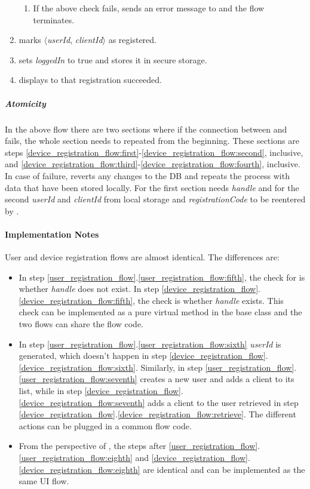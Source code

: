 \documentclass[a4paper,10pt,draft]{article}
\newcommand{\handle}{\emph{handle}}
\newcommand{\registrationCode}{\emph{registrationCode}}
\newcommand{\userId}{\emph{userId}}
\newcommand{\clientId}{\emph{clientId}}
\newcommand{\loggedIn}{\emph{loggedIn}}
\begin{document}
\begin{enumerate}
 \begin{enumerate}
  \item If the above check fails, \Server{} sends an error message to \Client{} and the flow terminates.
 \end{enumerate}
 \item\label{device_registration_flow:fourth} \Server{} marks $\langle$\userId{}, \clientId{}$\rangle$ as registered.
 \item \Client{} sets \loggedIn{} to true and stores it in secure storage.
 \item \Client{} displays to \User{} that registration succeeded.
\end{enumerate}

\subparagraph{Atomicity}
In the above flow there are two sections where if the connection between \Server{} and \Client{} fails, the whole section needs to repeated from the beginning. These sections are 
steps \ref{device_registration_flow:first}-\ref{device_registration_flow:second}, inclusive, and \ref{device_registration_flow:third}-\ref{device_registration_flow:fourth}, 
inclusive. In case of failure, \Server{} reverts any changes to the DB and \Client{} repeats the process with data that have been stored locally. For the first section \Client{} 
needs \handle{} and for the second \userId{} and \clientId{} from local storage and \registrationCode{} to be reentered by \User{}.

\paragraph{Implementation Notes}
User and device registration flows are almost identical. The differences are:

\begin{itemize}
 \item In step \ref{user_registration_flow}.\ref{user_registration_flow:fifth}, the check for is whether \handle{} does not exist. In step 
\ref{device_registration_flow}.\ref{device_registration_flow:fifth}, the check is whether \handle{} exists. This check can be implemented as a pure virtual method in the base 
class and the two flows can share the flow code.
 \item In step \ref{user_registration_flow}.\ref{user_registration_flow:sixth} \userId{} is generated, which doesn't happen in step 
\ref{device_registration_flow}.\ref{device_registration_flow:sixth}. Similarly, in step \ref{user_registration_flow}.\ref{user_registration_flow:seventh} \Server{}
creates a new user and adds a client to its list, while in step \ref{device_registration_flow}.\ref{device_registration_flow:seventh} \Server{} adds a client to the user retrieved 
in step \ref{device_registration_flow}.\ref{device_registration_flow:retrieve}. The different actions can be plugged in a common flow code.
 \item From the perspective of \Client{}, the steps after \ref{user_registration_flow}.\ref{user_registration_flow:eighth} and 
\ref{device_registration_flow}.\ref{device_registration_flow:eighth} are identical and can be implemented as the same UI flow.
\end{itemize}
\end{document}
